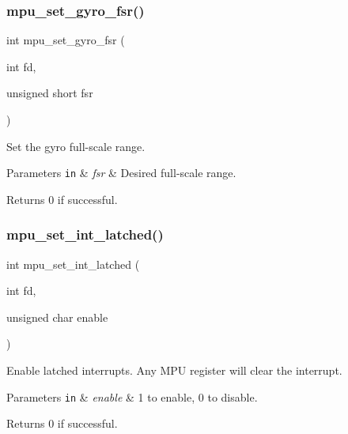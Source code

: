 \subsubsection{mpu\+\_\+set\+\_\+gyro\+\_\+fsr()}
{\footnotesize\ttfamily int mpu\+\_\+set\+\_\+gyro\+\_\+fsr (\begin{DoxyParamCaption}\item[{int}]{fd,  }\item[{unsigned short}]{fsr }\end{DoxyParamCaption})}



Set the gyro full-\/scale range. 


\begin{DoxyParams}[1]{Parameters}
\mbox{\tt in}  & {\em fsr} & Desired full-\/scale range. \\
\hline
\end{DoxyParams}
\begin{DoxyReturn}{Returns}
0 if successful. 
\end{DoxyReturn}
\mbox{\label{group___d_r_i_v_e_r_s_ga907b392a5c47ddde08e39dad87c9b7a3}} 
\subsubsection{mpu\+\_\+set\+\_\+int\+\_\+latched()}
{\footnotesize\ttfamily int mpu\+\_\+set\+\_\+int\+\_\+latched (\begin{DoxyParamCaption}\item[{int}]{fd,  }\item[{unsigned char}]{enable }\end{DoxyParamCaption})}



Enable latched interrupts. Any M\+PU register will clear the interrupt. 


\begin{DoxyParams}[1]{Parameters}
\mbox{\tt in}  & {\em enable} & 1 to enable, 0 to disable. \\
\hline
\end{DoxyParams}
\begin{DoxyReturn}{Returns}
0 if successful. 
\end{DoxyReturn}
\mbox{\label{group___d_r_i_v_e_r_s_gacc92fb1489ef32a04bcb6b0ebde4d657}} 
